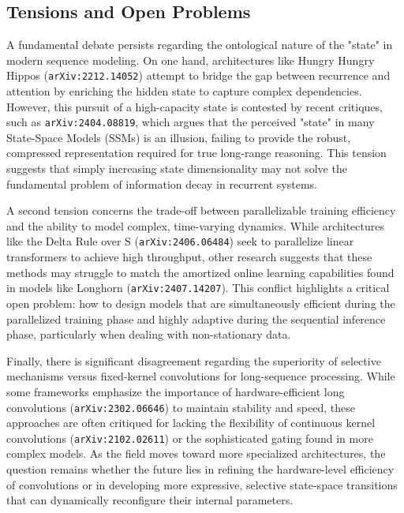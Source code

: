 \documentclass[11pt]{article}
\begin{document}
\subsection{Tensions and Open Problems}

A fundamental debate persists regarding the ontological nature of the "state" in modern sequence modeling. On one hand, architectures like Hungry Hungry Hippos (\texttt{arXiv:2212.14052}) attempt to bridge the gap between recurrence and attention by enriching the hidden state to capture complex dependencies. However, this pursuit of a high-capacity state is contested by recent critiques, such as \texttt{arXiv:2404.08819}, which argues that the perceived "state" in many State-Space Models (SSMs) is an illusion, failing to provide the robust, compressed representation required for true long-range reasoning. This tension suggests that simply increasing state dimensionality may not solve the fundamental problem of information decay in recurrent systems.

A second tension concerns the trade-off between parallelizable training efficiency and the ability to model complex, time-varying dynamics. While architectures like the Delta Rule over S (\texttt{arXiv:2406.06484}) seek to parallelize linear transformers to achieve high throughput, other research suggests that these methods may struggle to match the amortized online learning capabilities found in models like Longhorn (\texttt{arXiv:2407.14207}). This conflict highlights a critical open problem: how to design models that are simultaneously efficient during the parallelized training phase and highly adaptive during the sequential inference phase, particularly when dealing with non-stationary data.

Finally, there is significant disagreement regarding the superiority of selective mechanisms versus fixed-kernel convolutions for long-sequence processing. While some frameworks emphasize the importance of hardware-efficient long convolutions (\texttt{arXiv:2302.06646}) to maintain stability and speed, these approaches are often critiqued for lacking the flexibility of continuous kernel convolutions (\texttt{arXiv:2102.02611}) or the sophisticated gating found in more complex models. As the field moves toward more specialized architectures, the question remains whether the future lies in refining the hardware-level efficiency of convolutions or in developing more expressive, selective state-space transitions that can dynamically reconfigure their internal parameters.
\end{document}
